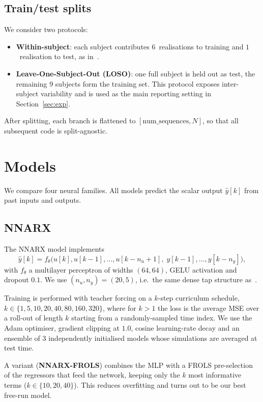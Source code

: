 \documentclass[conference]{IEEEtran}
\begin{document}
\subsection{Train/test splits}
We consider two protocols:
\begin{itemize}
    \item \textbf{Within-subject}: each subject contributes
          $6$~realisations to training and $1$~realisation to test, as
          in~\cite{Gu2021}.
    \item \textbf{Leave-One-Subject-Out (LOSO)}: one full subject is
          held out as test, the remaining $9$ subjects form the
          training set. This protocol exposes inter-subject variability
          and is used as the main reporting setting in
          Section~\ref{sec:exp}.
\end{itemize}
After splitting, each branch is flattened to
$[\text{num\_sequences},N]$, so that all subsequent code is
split-agnostic.

\section{Models}\label{sec:models}

We compare four neural families. All models predict the scalar output
$\hat{y}[k]$ from past inputs and outputs.

\subsection{NNARX}
The NNARX model implements
\begin{equation}
\hat{y}[k] = f_\theta\big(u[k],u[k-1],\ldots,u[k-n_u+1],\;
                          y[k-1],\ldots,y[k-n_y]\big),
\label{eq:nnarx}
\end{equation}
with $f_\theta$ a multilayer perceptron of widths $(64,64)$, GELU
activation and dropout $0.1$. We use $(n_u,n_y)=(20,5)$, i.e.\ the same
dense tap structure as~\cite{Gu2021}.

Training is performed with teacher forcing on a $k$-step curriculum
schedule, $k\in\{1,5,10,20,40,80,160,320\}$, where for $k>1$ the loss is
the average MSE over a roll-out of length $k$ starting from a
randomly-sampled time index. We use the Adam optimiser, gradient
clipping at $1.0$, cosine learning-rate decay and an ensemble of
$3$ independently initialised models whose simulations are averaged at
test time.

A variant (\textbf{NNARX-FROLS}) combines the MLP with a FROLS
pre-selection of the regressors that feed the network, keeping only the
$k$ most informative terms ($k\in\{10,20,40\}$). This reduces
overfitting and turns out to be our best free-run model.
\end{document}
